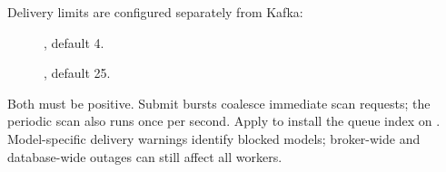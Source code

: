 Delivery limits are configured separately from Kafka:

\begin{description}
\item[]
  , default 4.
\item[]
  , default 25.
\end{description}

Both must be positive. Submit bursts coalesce immediate scan requests; the
periodic scan also runs once per second. Apply 
to install the  queue index on
. Model-specific delivery warnings
identify blocked models; broker-wide and database-wide outages can still
affect all workers.
